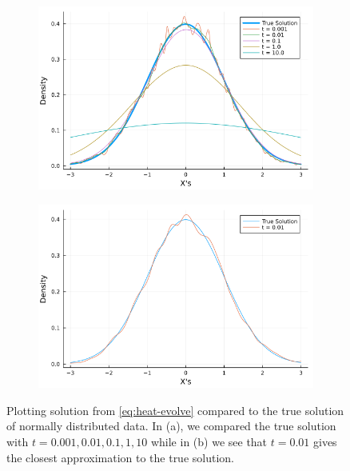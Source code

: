 \documentclass[12pt]{report}
\begin{document}
\begin{solution}
    \begin{figure}[H]
      \begin{subfigure}[b]{0.5\linewidth}
        \centering
        \includegraphics[width=\linewidth]{images/3a1.png}
        \caption{}
        \label{fig2:a}
        \vspace{4ex}
      \end{subfigure}%
      \begin{subfigure}[b]{0.5\linewidth}
        \centering
        \includegraphics[width=\linewidth]{images/3a2.png}
        \caption{}
        \label{fig2:b}
        \vspace{4ex}
      \end{subfigure}
      \caption{Plotting solution from \ref{eq:heat-evolve} compared to the true solution of normally distributed data. In (a), we compared the true solution with $t=0.001,0.01,0.1,1,10$ while in (b) we see that $t=0.01$ gives the closest approximation to the true solution.}
      \label{fig2}
  \end{figure} 



\end{solution}
\end{document}
